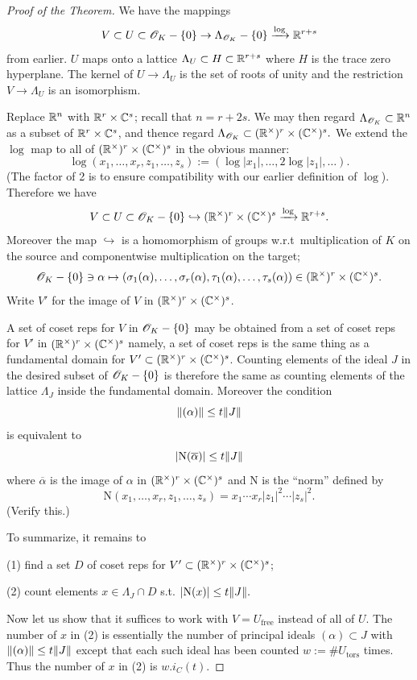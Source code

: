 \documentclass[10pt,a4paper,reqno]{amsart}
\begin{document}
\begin{proof}[Proof of the Theorem]
We have the mappings \[V \subset U \subset \mathscr{O}_K - \{0\} \rightarrow
\Lambda_{\mathscr{O}_K} - \{0\} \xrightarrow{\log} \mathbb{R}^{r+s}\] from earlier. $U$ maps
onto a lattice $\Lambda_U \subset H \subset \mathbb{R}^{r+s}$ where $H$ is the trace
zero hyperplane. The kernel of $U\rightarrow \Lambda_U$ is the set of roots of
unity and the restriction $V \rightarrow \Lambda_U$ is an isomorphism.

Replace $\mathbb{R}^n$ with $\mathbb{R}^r\times \mathbb{C}^s$; recall that $n= r + 2s$. We may then
regard $\Lambda_{\mathscr{O}_K} \subset \mathbb{R}^n$ as a subset of $\mathbb{R}^r\times \mathbb{C}^s$, and
thence regard $\Lambda_{\mathscr{O}_K} \subset (\mathbb{R}^\times)^r\times (\mathbb{C}^\times)^s.$ We
extend the $\log$ map to all of $(\mathbb{R}^\times)^r\times (\mathbb{C}^\times)^s$ in the
obvious manner: \[\log(x_1,\dots,x_r,z_1,\dots,z_s) := (\log |x_1|, \dots,
2\log|z_1|,\dots).\] (The factor of 2 is to ensure compatibility with our
earlier definition of $\log$). Therefore we have \[V \subset U \subset \mathscr{O}_K -
\{0\} \hookrightarrow (\mathbb{R}^\times)^r\times (\mathbb{C}^\times)^s \xrightarrow{\log}
\mathbb{R}^{r+s}.\] Moreover the map $\hookrightarrow$ is a homomorphism of groups
w.r.t~multiplication of $K$ on the source and componentwise multiplication on
the target; \[\mathscr{O}_K - \{0\} \ni \alpha \mapsto (\sigma_1(\alpha), \dots,
\sigma_r(\alpha), \tau_1(\alpha), \dots, \tau_s(\alpha)) \in
(\mathbb{R}^\times)^r\times (\mathbb{C}^\times)^s.\] Write $V'$ for the image of $V$ in
$(\mathbb{R}^\times)^r\times (\mathbb{C}^\times)^s$.

A set of coset reps for $V$ in $\mathscr{O}_K - \{0\}$ may be obtained from a set of
coset reps for $V'$ in $(\mathbb{R}^\times)^r\times (\mathbb{C}^\times)^s$ namely, a set of
coset reps is the same thing as a fundamental domain for $V' \subset
(\mathbb{R}^\times)^r\times (\mathbb{C}^\times)^s$. Counting elements of the ideal $J$ in the
desired subset of $\mathscr{O}_K - \{0\}$ is therefore the same as counting elements of
the lattice $\Lambda_J$ inside the fundamental domain. Moreover the condition
\[\| (\alpha)\| \le t \| J\|\] is equivalent to
\[|\mathrm{N}(\overline{\alpha})| \le t\| J\|\] where $\overline{\alpha}$ is
the image of $\alpha$ in $(\mathbb{R}^\times)^r\times (\mathbb{C}^\times)^s$ and $\mathrm{N}$
is the ``norm'' defined by \[\mathrm{N}(x_1,\dots,x_r,z_1,\dots,z_s) = x_1
\cdots x_r |z_1|^2 \cdots |z_s|^2.\] (Verify this.)

To summarize, it remains to

(1) find a set $D$ of coset reps for $V' \subset (\mathbb{R}^\times)^r\times
(\mathbb{C}^\times)^s$;

(2) count elements $x\in \Lambda_J\cap D$ s.t. \(|\mathrm{N}(x)| \le
t\| J\|.\)

Now let us show that it suffices to work with $V = U_{\text{free}}$ instead of
all of $U$. The number of $x$ in (2) is essentially the number of principal
ideals $(\alpha)\subset J$ with $\| (\alpha)\| \le t\| J\|$ except that
each such ideal has been counted $w := \# U_{\text{tors}}$ times. Thus the
number of $x$ in (2) is $w. i_C(t)$.


\end{proof}
\end{document}
